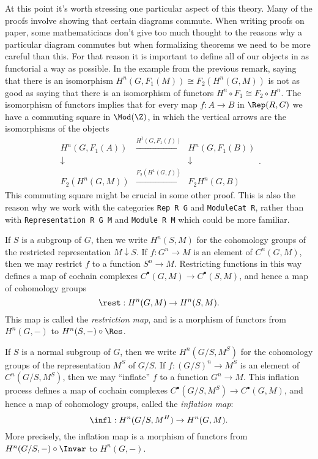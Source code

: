 \begin{remark}
	At this point it's worth stressing one particular aspect of this theory.
	Many of the proofs involve showing that certain diagrams commute. When writing proofs on paper,
	some mathematicians don't give too much thought to the reasons why a particular diagram commutes
	but when formalizing theorems we need to be more careful than this.
	For that reason it is important to define all of our objects in as functorial a way as possible.
	In the example from the previous remark,
	saying that there is an isomorphism $H^n(G,F_1(M)) \cong F_2(H^n(G,M))$
	is not as good as saying that there is an isomorphism of functors
	$H^n \circ F_1 \cong F_2 \circ H^n$.
	The isomorphism of functors implies that for every map $f : A \to B$ in $\Rep(R,G)$
	we have a commuting square in $\Mod(\Z)$, in which the vertical arrows are the isomorphisms
	of the objects
	\[
		\begin{matrix}
			H^n(G,F_1(A)) & \stackrel{H^1(G,F_1(f))}\to & H^n(G,F_1(B))\\
			\downarrow &&\downarrow \\
			F_2(H^n(G,M)) & \stackrel{F_2(H^1(G,f))}\to & F_2 H^n(G,B)
		\end{matrix} .
	\]
	This commuting square might be crucial in some other proof.
	This is also the reason why we work with the categories \texttt{Rep R G} and \texttt{ModuleCat R},
	rather than with \texttt{Representation R G M} and \texttt{Module R M} which could be more
	familiar.
\end{remark}

\begin{definition} \label{def:restriction map}
	If $S$ is a subgroup of $G$, then we write $H^n(S,M)$ for the
	cohomology groups of the restricted representation $M \downarrow S$.
	If $f : G^n \to M$ is an element of $C^n(G,M)$, then we may restrict $f$ to
	a function $S^n \to M$. Restricting functions in this way defines a map of
	cochain complexes $C^\bullet(G,M) \to C^\bullet(S,M)$, and hence a map of
	cohomology groups
	\[
		\rest : H^n(G,M) \to H^n(S,M).
	\]
	This map is called the \emph{restriction map}, and is a morphism of functors
	from $H^n(G,-)$ to $H^n(S, -) \circ \Res$.
\end{definition}

\begin{definition} \label{def:inflation map}
	If $S$ is a normal subgroup of $G$, then we write $H^n(G/S,M^S)$ for the
	cohomology groups of the representation $M^S$ of $G/S$.
	If $f : (G/S)^n \to M^S$ is an element of $C^n(G/S,M^S)$, then we may ``inflate'' $f$ to
	a function $G^n \to M$. This inflation process defines a map of
	cochain complexes $C^\bullet(G/S,M^S) \to C^\bullet(G,M)$, and hence a map of
	cohomology groups, called the \emph{inflation map}:
	\[
		\infl : H^n(G/S,M^H) \to H^n(G,M).
	\]
	More precisely, the inflation map is a morphism of functors from
	$H^n (G/S, -)\circ \Invar$ to $H^n(G,-)$.
\end{definition}


